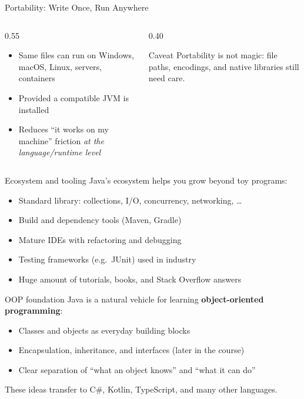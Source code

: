 \documentclass[aspectratio=169,11pt]{beamer}
\begin{document}
    \begin{frame}{Portability: Write Once, Run Anywhere}
        \begin{columns}[T]
            \begin{column}{0.55\textwidth}
                \begin{itemize}
                    \item Same  files can run on Windows, macOS, Linux, servers, containers
                    \item Provided a compatible JVM is installed
                    \item Reduces ``it works on my machine'' friction \emph{at the language/runtime level}
                \end{itemize}
            \end{column}
            \begin{column}{0.40\textwidth}
                \begin{block}{Caveat}
                    Portability is not magic: file paths, encodings, and native libraries still need care.
                \end{block}
            \end{column}
        \end{columns}
    \end{frame}

    \begin{frame}{Ecosystem and tooling}
        Java's ecosystem helps you grow beyond toy programs:
        \begin{itemize}
            \item Standard library: collections, I/O, concurrency, networking, \ldots
            \item Build and dependency tools (Maven, Gradle)
            \item Mature IDEs with refactoring and debugging
            \item Testing frameworks (e.g.\ JUnit) used in industry
            \item Huge amount of tutorials, books, and Stack Overflow answers
        \end{itemize}
    \end{frame}

    \begin{frame}{OOP foundation}
        Java is a natural vehicle for learning \textbf{object-oriented programming}:
        \begin{itemize}
            \item Classes and objects as everyday building blocks
            \item Encapsulation, inheritance, and interfaces (later in the course)
            \item Clear separation of ``what an object knows'' and ``what it can do''
        \end{itemize}
        \vspace{0.6em}
        These ideas transfer to C\#, Kotlin, TypeScript, and many other languages.
    \end{frame}
\end{document}
